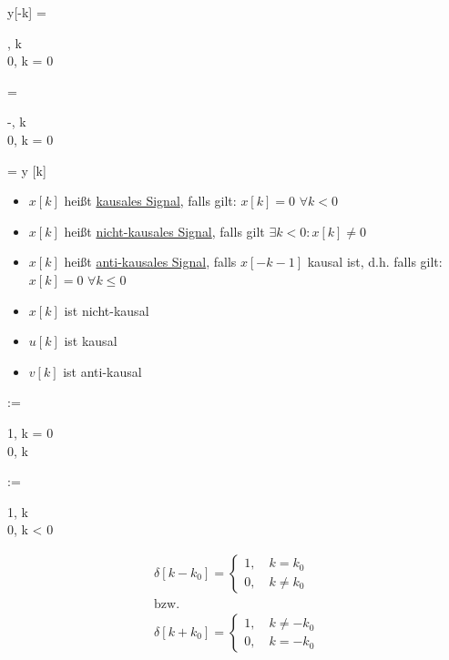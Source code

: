 \begin{abox}
	y[-k] = \begin{cases}
		, \quad k \\
		0, \quad k = 0
	\end{cases} = \begin{cases}
		-, \quad k  \\
		0, \quad k = 0 
	\end{cases}  = y [k] 
\end{abox}

\begin{tbox}
	\begin{itemize}
		\item  $x[k]$ heißt \underline{kausales Signal}, falls gilt: $x[k] = 0$ $\forall k < 0$
		\item $x[k]$ heißt \underline{nicht-kausales Signal}, falls gilt $\exists k < 0 : x[k] \ne 0$
		\item $x[k]$ heißt \underline{anti-kausales Signal}, falls $x[-k-1]$ kausal ist, d.h. falls gilt: $x[k] = 0$ $\forall k \leqslant 0$
	\end{itemize}
\end{tbox}

\begin{tbox}
	\begin{itemize}
		\item $x[k]$ ist nicht-kausal
		\item $u[k]$ ist kausal
		\item $v[k]$ ist anti-kausal
	\end{itemize}
\end{tbox}

\begin{abox}
	\delta[k] := \begin{cases}
		1, \quad k = 0\\ 0, \quad k 
	\end{cases}
\end{abox}

\begin{abox}
	\epsilon[k] := \begin{cases}
		1, \quad k \\ 0, \quad k < 0
	\end{cases}
\end{abox}

\begin{dbox}[width=0.45\textwidth]
	\begin{align*}
	\delta[k-k_0] = \begin{cases}
	1, \quad k = k_0\\ 0, \quad k \ne k_0
	\end{cases}
	\\ \text{bzw.} \\
	\delta[k+k_0] = \begin{cases}
	1, \quad k \ne -k_0\\ 0, \quad k = -k_0
	\end{cases}
	\end{align*}
\end{dbox}

